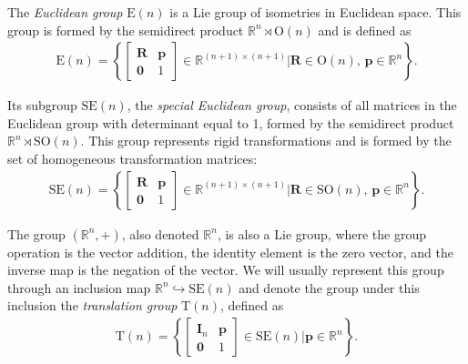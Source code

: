\begin{example}\label{ex:euclidean-group-special-euclidean-group}
    The \emph{Euclidean group} $\text{E}(n)$ is a Lie group of isometries in Euclidean space. This group is formed by the semidirect product $\mathbb{R}^n \rtimes \text{O}(n)$ and is defined as
    \begin{align}
        \text{E}(n) = \left\{\begin{bmatrix}
            \mathbf{R} & \mathbf{p} \\ \mathbf{0} & 1
        \end{bmatrix} \in \mathbb{R}^{(n+1)\times(n+1)} | \mathbf{R}\in\text{O}(n),\, \mathbf{p}\in\mathbb{R}^n\right\}.
    \end{align}

    Its subgroup $\text{SE}(n)$, the \emph{special Euclidean group}, consists of all matrices in the Euclidean group with determinant equal to 1, formed by the semidirect product $\mathbb{R}^n\rtimes \text{SO}(n)$. This group represents rigid transformations and is formed by the set of homogeneous transformation matrices:
    \begin{align}
        \text{SE}(n) = \left\{\begin{bmatrix}
            \mathbf{R} & \mathbf{p} \\ \mathbf{0} & 1
        \end{bmatrix} \in \mathbb{R}^{(n+1)\times(n+1)} | \mathbf{R}\in\text{SO}(n),\, \mathbf{p}\in\mathbb{R}^n\right\}.
    \end{align}
\end{example}
\begin{example}\label{ex:translation-group}
    The group $(\mathbb{R}^n,+)$, also denoted $\mathbb{R}^n$, is also a Lie group, where the group operation is the vector addition, the identity element is the zero vector, and the inverse map is the negation of the vector. We will usually represent this group through an inclusion map $\mathbb{R}^n \hookrightarrow \text{SE}(n)$ and denote the group under this inclusion the \emph{translation group} $\text{T}(n)$, defined as
    \begin{align}
        \text{T}(n) = \left\{\begin{bmatrix}
            \mathbf{I}_n & \mathbf{p} \\ \mathbf{0} & 1
        \end{bmatrix} \in \text{SE}(n) | \mathbf{p}\in\mathbb{R}^n\right\}.
    \end{align}
\end{example}
